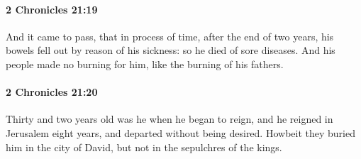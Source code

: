 		\paragraph{2 Chronicles 21:19} %
			\label{2CHRONICLES-21-19}

			And it came to pass, that in process of time, after the end of two years, his bowels fell out by reason of his sickness: so he died of sore diseases. And his people made no burning for him, like the burning of his fathers.


		\paragraph{2 Chronicles 21:20} %
			\label{2CHRONICLES-21-20}

			Thirty and two years old was he when he began to reign, and he reigned in Jerusalem eight years, and departed without being desired. Howbeit they buried him in the city of David, but not in the sepulchres of the kings.

